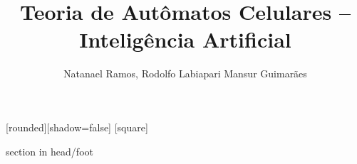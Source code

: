
[rounded][shadow=false]
[square]
{%
	\begin{beamercolorbox}{section in head/foot}
		\vskip2pt\insertsectionnavigationhorizontal{\textwidth}{}{}\vskip2pt
	\end{beamercolorbox}
}


\renewcommand{\rmdefault}{phv} %
\renewcommand{\sfdefault}{phv} %



\usepackage[utf8]{inputenc}
\usepackage[T1]{fontenc}
\usepackage[brazil]{babel}
\usepackage{verbatim}
\usepackage{graphicx}
\usepackage{url}
\usepackage{float}    
\usepackage[]{subfigure}
\usepackage{graphicx,color, amsmath, url}
\usepackage{scalefnt}
\usepackage{multicol}

\newcommand{\aspas}[1]{``#1''}

\graphicspath{{img/}}

	




\title[Autômatos Celulares]{Teoria de Autômatos Celulares --\\ Inteligência Artificial}
\author[Natanael R., Rodolfo L. M. G..]{Natanael Ramos, Rodolfo Labiapari Mansur Guimarães}
